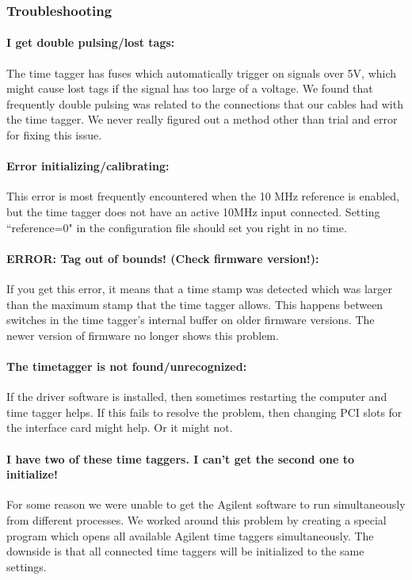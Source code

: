 \documentclass[10pt]{article}
\begin{document}
\subsubsection{Troubleshooting}
\paragraph{I get double pulsing/lost tags:} The time tagger has fuses which automatically trigger on signals over 5V,
which might cause lost tags if the signal has too large of a voltage. We found that frequently double pulsing was related to
the connections that our cables had with the time tagger. We never really figured out a method other than trial and error
for fixing this issue.
\paragraph{Error initializing/calibrating:} This error is most frequently encountered when the 10 MHz reference
is enabled, but the time tagger does not have an active 10MHz input connected. Setting ``reference=0" in the configuration
file should set you right in no time.
\paragraph{ERROR: Tag out of bounds! (Check firmware version!):} If you get this error,
it means that a time stamp was detected which was larger than the maximum stamp that the time tagger allows. This
happens between switches in the time tagger's internal buffer on older firmware versions. The newer version of firmware
no longer shows this problem.
\paragraph{The timetagger is not found/unrecognized:} If the driver software is installed, then sometimes restarting the
computer and time tagger helps. If this fails to resolve the problem, then changing PCI slots for the interface card
might help. Or it might not.
\paragraph{I have two of these time taggers. I can't get the second one to initialize!} For some reason we were unable to
get the Agilent software to run simultaneously from different processes. We worked around this problem by creating a special
program which opens all available Agilent time taggers simultaneously. The downside is that all connected time taggers
will be initialized to the same settings.
\end{document}
